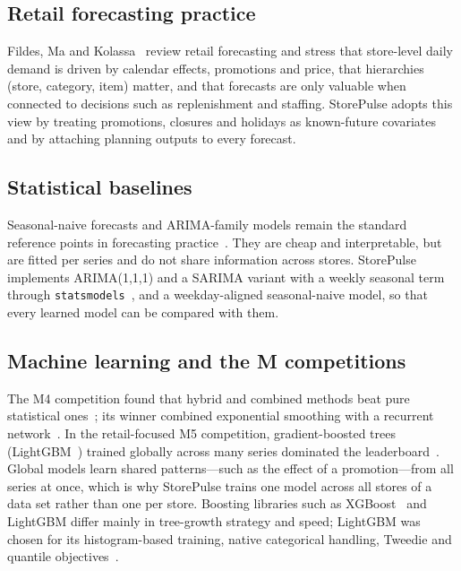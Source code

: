 \documentclass[conference]{IEEEtran}
\newcommand{\code}[1]{\texttt{\small #1}}
\begin{document}
\subsection{Retail forecasting practice}
Fildes, Ma and Kolassa~\cite{fildes2022retail} review retail forecasting and stress that store-level
daily demand is driven by calendar effects, promotions and price, that hierarchies (store, category,
item) matter, and that forecasts are only valuable when connected to decisions such as
replenishment and staffing. StorePulse adopts this view by treating promotions, closures and
holidays as known-future covariates and by attaching planning outputs to every forecast.

\subsection{Statistical baselines}
Seasonal-naive forecasts and ARIMA-family models remain the standard reference points in
forecasting practice~\cite{hyndman2021fpp3}. They are cheap and interpretable, but are fitted per
series and do not share information across stores. StorePulse implements ARIMA(1,1,1) and a
SARIMA variant with a weekly seasonal term through \code{statsmodels}~\cite{seabold2010statsmodels,statsmodelssarimax},
and a weekday-aligned seasonal-naive model, so that every learned model can be compared with them.

\subsection{Machine learning and the M competitions}
The M4 competition found that hybrid and combined methods beat pure statistical
ones~\cite{makridakis2020m4}; its winner combined exponential smoothing with a recurrent
network~\cite{smyl2020hybrid}. In the retail-focused M5 competition, gradient-boosted trees
(LightGBM~\cite{ke2017lightgbm}) trained globally across many series dominated the
leaderboard~\cite{makridakis2022m5}. Global models learn shared patterns---such as the effect of a
promotion---from all series at once, which is why StorePulse trains one model across all stores of a
data set rather than one per store. Boosting libraries such as XGBoost~\cite{chen2016xgboost} and
LightGBM differ mainly in tree-growth strategy and speed; LightGBM was chosen for its histogram-based
training, native categorical handling, Tweedie and quantile objectives~\cite{lightgbmdocs}.
\end{document}
